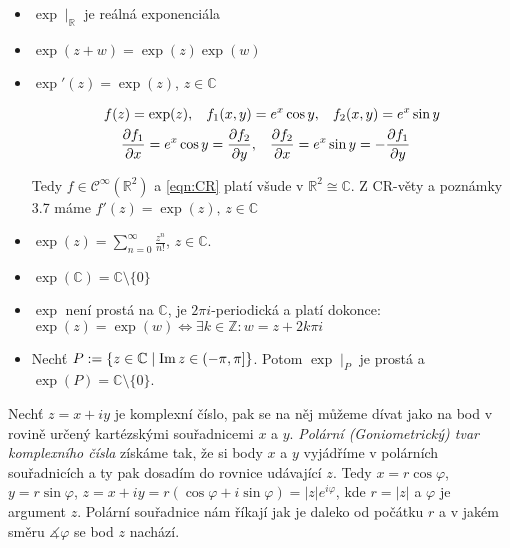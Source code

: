 \begin{properties}
\mbox{}
\vspace{-2em}
\begin{itemize}    
    \item $\exp \mid_\mathbb{R}$ je reálná exponenciála 
    \item $\exp(z+w)=\exp(z)\exp(w)$
    \item $\exp'(z)=\exp(z)$, $ z \in\mathbb{C}$
 
 \begin{equation}
 \begin{aligned}
    f(z) = \exp(z), \hspace{3mm}
    f_1(x,y) &=e^x \cos y, \hspace{3mm}
    f_2(x,y) =e^x\sin y\\
    \frac{\partial f_1}{\partial x} = e^x\cos y = \frac{\partial f_2}{\partial y}&, \hspace{3mm}
     \frac{\partial f_2}{\partial x} = e^x \sin y= - \frac{\partial f_1}{\partial y}
\end{aligned}
\end{equation}
   
     
     
     
    Tedy $f\in\mathcal{C}^{\infty}(\mathbb{R}^2)$ %
    a \cref{eqn:CR} platí všude v $\mathbb{R}^2\cong\mathbb{C}$. Z CR-věty a poznámky 3.7 máme $f'(z)=\exp(z)\text{, } z\in\mathbb{C}$
    \item $\exp(z)=\sum_{n=0}^{\infty}\frac{z^n}{n!}$, $z\in\mathbb{C}\text{.}$
    \item $\exp(\mathbb{C})=\mathbb{C}\setminus\{0\}$ 
    \item $\exp$ není prostá na $\mathbb{C}$, je $2\pi i$-periodická a platí dokonce:
    \newline
    $\exp(z) =\exp(w) \iff\exists k \in\mathbb{Z}\colon w=z+2k\pi i$
     \item Nechť $P:=\{z\in\mathbb{C}\mid \operatorname{Im} z \in \left (-\pi,\pi\right ]\}$.
     Potom $\exp\mid_P$ je prostá a $\exp(P)=\mathbb{C}\setminus\{0\}$.
    \newline
  \end{itemize}  
  \end{properties}
  \begin{note}
    Nechť $z=x+iy$ je komplexní číslo, pak se na něj můžeme dívat jako na bod v rovině určený kartézskými souřadnicemi $x$ a $y$. \emph{Polární (Goniometrický) tvar komplexního čísla} získáme tak, že si body $x$ a $y$ vyjádříme v polárních souřadnicích a ty pak dosadím do rovnice udávající $z$. Tedy
       $x=r\cos \varphi$, 
       $y=r\sin \varphi$, 
       $z=x+iy=r(\cos \varphi + i \sin \varphi)=\lvert z \rvert e^{i\varphi} $, kde $r=\lvert z \rvert$ a $\varphi$ je argument $z$.
       Polární souřadnice nám říkají jak je daleko od počátku $r$ a v jakém směru  $\measuredangle \varphi$ se bod $z$ nachází.
 \end{note}
     
